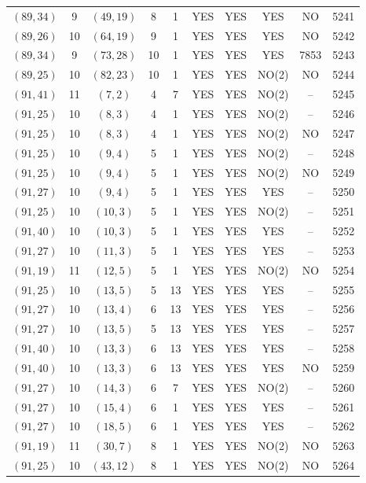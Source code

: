 \begin{longtable}{|c|c|c|c|c|c|c|c|c|c|}
$(89, 34)$ & 9 & $(49, 19)$ & 8 & 1 & YES & YES & YES & NO & 5241\\
$(89, 26)$ & 10 & $(64, 19)$ & 9 & 1 & YES & YES & YES & NO & 5242\\
$(89, 34)$ & 9 & $(73, 28)$ & 10 & 1 & YES & YES & YES & 7853 & 5243\\
$(89, 25)$ & 10 & $(82, 23)$ & 10 & 1 & YES & YES & NO(2) & NO & 5244\\
$(91, 41)$ & 11 & $(7, 2)$ & 4 & 7 & YES & YES & NO(2) & -- & 5245\\
$(91, 25)$ & 10 & $(8, 3)$ & 4 & 1 & YES & YES & NO(2) & -- & 5246\\
$(91, 25)$ & 10 & $(8, 3)$ & 4 & 1 & YES & YES & NO(2) & NO & 5247\\
$(91, 25)$ & 10 & $(9, 4)$ & 5 & 1 & YES & YES & NO(2) & -- & 5248\\
$(91, 25)$ & 10 & $(9, 4)$ & 5 & 1 & YES & YES & NO(2) & NO & 5249\\
$(91, 27)$ & 10 & $(9, 4)$ & 5 & 1 & YES & YES & YES & -- & 5250\\
$(91, 25)$ & 10 & $(10, 3)$ & 5 & 1 & YES & YES & NO(2) & -- & 5251\\
$(91, 40)$ & 10 & $(10, 3)$ & 5 & 1 & YES & YES & YES & -- & 5252\\
$(91, 27)$ & 10 & $(11, 3)$ & 5 & 1 & YES & YES & YES & -- & 5253\\
$(91, 19)$ & 11 & $(12, 5)$ & 5 & 1 & YES & YES & NO(2) & NO & 5254\\
$(91, 25)$ & 10 & $(13, 5)$ & 5 & 13 & YES & YES & YES & -- & 5255\\
$(91, 27)$ & 10 & $(13, 4)$ & 6 & 13 & YES & YES & YES & -- & 5256\\
$(91, 27)$ & 10 & $(13, 5)$ & 5 & 13 & YES & YES & YES & -- & 5257\\
$(91, 40)$ & 10 & $(13, 3)$ & 6 & 13 & YES & YES & YES & -- & 5258\\
$(91, 40)$ & 10 & $(13, 3)$ & 6 & 13 & YES & YES & YES & NO & 5259\\
$(91, 27)$ & 10 & $(14, 3)$ & 6 & 7 & YES & YES & NO(2) & -- & 5260\\
$(91, 27)$ & 10 & $(15, 4)$ & 6 & 1 & YES & YES & YES & -- & 5261\\
$(91, 27)$ & 10 & $(18, 5)$ & 6 & 1 & YES & YES & YES & -- & 5262\\
$(91, 19)$ & 11 & $(30, 7)$ & 8 & 1 & YES & YES & NO(2) & NO & 5263\\
$(91, 25)$ & 10 & $(43, 12)$ & 8 & 1 & YES & YES & NO(2) & NO & 5264\\

\end{longtable}
